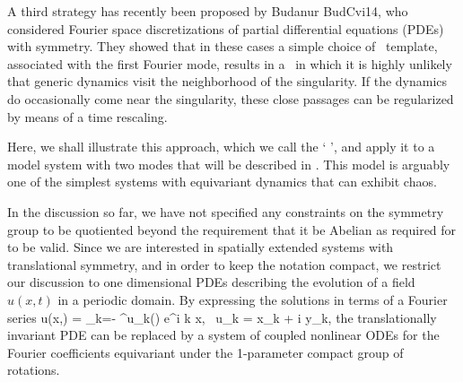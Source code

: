 \documentclass[aip,cha,
reprint,
secnumarabic,
nofootinbib, tightenlines,
nobibnotes, showkeys, showpacs,
superscriptaddress,
]{revtex4-1}
\begin{document}
A third strategy has recently been proposed by Budanur \etal\rf
{BudCvi14}, who considered Fourier space discretizations of 
partial differential equations (PDEs) with  symmetry. They 
showed that in these cases a simple choice of \slice\ template, 
associated with the first Fourier mode, results in a \slice\ in 
which it is highly unlikely that generic dynamics visit the 
neighborhood of the singularity. If the dynamics do occasionally 
come near the singularity, these close passages can be regularized 
by means of a time rescaling.

Here, we shall illustrate this approach, which we call the `
\fFslice', and apply it to a model system with two modes that 
will be described in . This model is arguably 
one of the simplest systems with  equivariant dynamics that 
can exhibit chaos.

In the discussion so far, we have not specified any constraints on 
the symmetry group to be quotiented beyond the requirement that it 
be Abelian as required for  to be valid. 
Since we are interested in spatially extended systems with 
translational symmetry, and in order to keep the notation compact, 
we restrict our discussion to one dimensional PDEs describing the 
evolution of a field $u(x,t)$ in a periodic domain. By expressing 
the solutions in terms of a Fourier series
\beq
	u(x,\zeit) = \sum\limits_{k=- \infty}^\infty u_k\left(\zeit\right) e^{i k x}, \,\,\,u_k = x_k + i y_k,
the translationally invariant PDE can be replaced by a system of 
coupled nonlinear ODEs for the Fourier coefficients equivariant 
under the 1-parameter compact group of  rotations.
\end{document}
